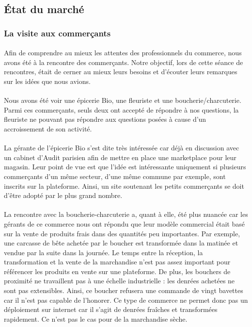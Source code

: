 \documentclass[a4paper, 12pt]{article}
\begin{document}
\subsection{État du marché}
\subsubsection{La visite aux commerçants}

\paragraph{}Afin de comprendre au mieux les attentes des professionnels du commerce, nous avons été à la rencontre des commerçants. Notre objectif, lors de cette séance de rencontres, était de cerner au mieux leurs besoins et d’écouter leurs remarques sur les idées que nous avions.
\paragraph{}Nous avons été voir une épicerie Bio, une fleuriste et une boucherie/charcuterie. Parmi ces commerçants, seuls deux ont accepté de répondre à nos questions, la fleuriste ne pouvant pas répondre aux questions posées à cause d'un accroissement de son activité.
\paragraph{}La gérante de l’épicerie Bio s’est dite très intéressée car déjà en discussion avec un cabinet d’Audit parisien afin de mettre en place une marketplace pour leur magasin. Leur point de vue est que l’idée est intéressante uniquement si plusieurs commerçants d’un même secteur, d’une même commune par exemple, sont inscrits sur la plateforme. Ainsi, un site soutenant les petits commerçants se doit d'être adopté par le plus grand nombre.
\paragraph{}La rencontre avec la boucherie-charcuterie a, quant à elle, été plus nuancée car les gérants de ce commerce nous ont répondu que leur modèle commercial était basé sur la vente de produits frais dans des quantités peu importantes. Par exemple, une carcasse de bête achetée par le boucher est transformée dans la matinée et vendue par la suite dans la journée. Le temps entre la réception, la transformation et la vente de la marchandise n’est pas assez important pour référencer les produits en vente sur une plateforme. De plus, les bouchers de proximité ne travaillent pas à une échelle industrielle : les denrées achetées ne sont pas extensibles. Ainsi, ce boucher refusera une commande de vingt bavettes car il n’est pas capable de l’honorer. Ce type de commerce ne permet donc pas un déploiement sur internet car il s’agit de denrées fraîches et transformées rapidement. Ce n’est pas le cas pour de la marchandise sèche.
\end{document}
